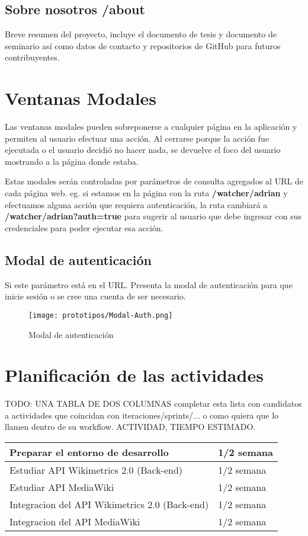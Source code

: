 \subsection{Sobre nosotros /about}
Breve resumen del proyecto, incluye el documento de tesis y documento de seminario así como datos de contacto y repositorios de GitHub para futuros contribuyentes.


\section{Ventanas Modales}
Las ventanas modales pueden sobreponerse a cualquier página en la aplicación y permiten al usuario efectuar una acción. Al cerrarse porque la acción fue ejecutada o el usuario decidió no hacer nada, se devuelve el foco del usuario mostrando a la página donde estaba.

Estas modales serán controladas por parámetros de consulta agregados al URL de cada página web. eg. si estamos en la página con la ruta \textbf{/watcher/adrian} y efectuamos alguna acción que requiera autenticación, la ruta cambiará a \textbf{/watcher/adrian?auth=true} para sugerir al usuario que debe ingresar con sus credenciales para poder ejecutar esa acción.

\subsection{Modal de autenticación}

Si este parámetro está en el URL. Presenta la modal de autenticación para que inicie sesión o se cree una cuenta de ser necesario.

\begin{figure}[H]
    \centering
    \texttt{[image: prototipos/Modal-Auth.png]}
    \caption{Modal de autenticación}
    \label{ModalAuth}
\end{figure}


\section{Planificación de las actividades}

TODO: UNA TABLA DE DOS COLUMNAS 
completar esta lista con candidatos a actividades que coincidan con iteraciones/sprints/... o como quiera que lo llamen dentro de su workflow.
ACTIVIDAD, TIEMPO ESTIMADO.

\begin{center}
\begin{tabular}{ | m{8cm} | m{5cm} | } 
 \hline
 Preparar el entorno de desarrollo & 1/2 semana \\ 
 \hline
 Estudiar API Wikimetrics 2.0 (Back-end) & 1/2 semana \\ 
 \hline
 Estudiar API MediaWiki & 1/2 semana \\ 
 \hline
 Integracion del API Wikimetrics 2.0 (Back-end) & 1/2 semana \\
 \hline
 Integracion del API MediaWiki & 1/2 semana \\
 \hline
\end{tabular}
\end{center}